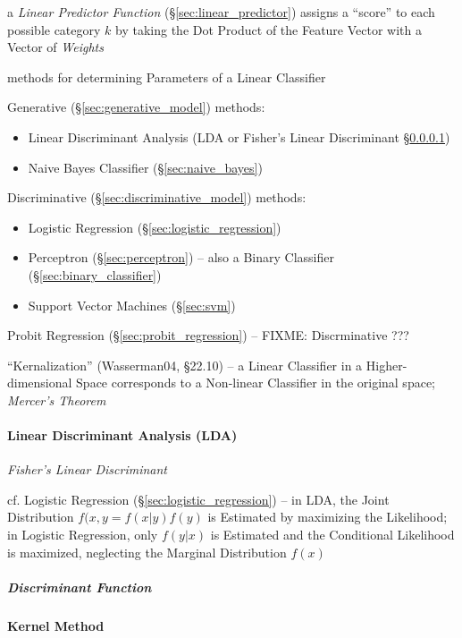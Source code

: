 a \emph{Linear Predictor Function} (\S\ref{sec:linear_predictor}) assigns a
``score'' to each possible category $k$ by taking the Dot Product of the Feature
Vector with a Vector of \emph{Weights}

methods for determining Parameters of a Linear Classifier

Generative (\S\ref{sec:generative_model}) methods:
\begin{itemize}
  \item Linear Discriminant Analysis (LDA or Fisher's Linear Discriminant
    \S\ref{sec:lda})
  \item Naive Bayes Classifier (\S\ref{sec:naive_bayes})
\end{itemize}

Discriminative (\S\ref{sec:discriminative_model}) methods:
\begin{itemize}
  \item Logistic Regression (\S\ref{sec:logistic_regression})
  \item Perceptron (\S\ref{sec:perceptron}) -- also a Binary Classifier
    (\S\ref{sec:binary_classifier})
  \item Support Vector Machines (\S\ref{sec:svm})
\end{itemize}

Probit Regression (\S\ref{sec:probit_regression}) -- FIXME: Discrminative ???

``Kernalization'' (Wasserman04, \S22.10) -- a Linear Classifier in a
Higher-dimensional Space corresponds to a Non-linear Classifier in the original
space; \emph{Mercer's Theorem}



\paragraph{Linear Discriminant Analysis (LDA)}\label{sec:lda}\hfill

\emph{Fisher's Linear Discriminant}

cf. Logistic Regression (\S\ref{sec:logistic_regression}) -- in LDA, the Joint
Distribution $f(x,y = f(x|y)f(y)$ is Estimated by maximizing the Likelihood; in
Logistic Regression, only $f(y|x)$ is Estimated and the Conditional Likelihood
is maximized, neglecting the Marginal Distribution $f(x)$



\subparagraph{Discriminant Function}\label{sec:discriminant_function}\hfill



\paragraph{Kernel Method}\label{sec:kernel_method}\hfill

